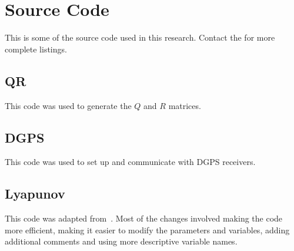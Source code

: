 \chapter{Source Code}%
\label{ch:code}
This is some of the source code used in this research.
Contact the  for more complete listings.

\section{QR}%
\label{sec:qrcode}
This code was used to generate the $Q$ and $R$ matrices.
\lstset{language=C++}

\clearpage
\section{DGPS}%
\label{sec:dgpscode}
This code was used to set up and communicate with DGPS receivers.

\clearpage
\section{Lyapunov}%
\label{sec:lyapunovcode}
This code was adapted from~\cite{Rusu05RobotuxLyapunov}.
Most of the changes involved making the code more efficient, making it easier to modify the parameters and variables, adding additional comments and using more descriptive variable names.
\lstset{language=Matlab}
